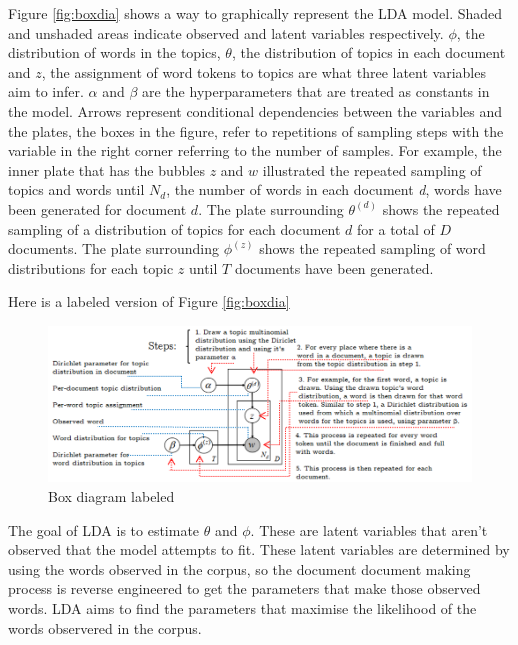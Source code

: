 \documentclass[
]{article}
\begin{document}
Figure \ref{fig:boxdia} shows a way to graphically represent the LDA
model. Shaded and unshaded areas indicate observed and latent variables
respectively. \(\phi\), the distribution of words in the topics,
\(\theta\), the distribution of topics in each document and \(z\), the
assignment of word tokens to topics are what three latent variables aim
to infer. \(\alpha\) and \(\beta\) are the hyperparameters that are
treated as constants in the model. Arrows represent conditional
dependencies between the variables and the plates, the boxes in the
figure, refer to repetitions of sampling steps with the variable in the
right corner referring to the number of samples. For example, the inner
plate that has the bubbles \(z\) and \(w\) illustrated the repeated
sampling of topics and words until \(N_d\), the number of words in each
document \emph{d}, words have been generated for document \(d\). The
plate surrounding \(\theta^{(d)}\) shows the repeated sampling of a
distribution of topics for each document \(d\) for a total of \(D\)
documents. The plate surrounding \(\phi^{(z)}\) shows the repeated
sampling of word distributions for each topic \(z\) until \(T\)
documents have been generated.

Here is a labeled version of Figure \ref{fig:boxdia}

\begin{figure}

{\centering \includegraphics[width=1\linewidth]{images/plate dia lab} 

}

\caption{Box diagram labeled}\label{fig:platedialab}
\end{figure}

The goal of LDA is to estimate \(\theta\) and \(\phi\). These are latent
variables that aren't observed that the model attempts to fit. These
latent variables are determined by using the words observed in the
corpus, so the document document making process is reverse engineered to
get the parameters that make those observed words. LDA aims to find the
parameters that maximise the likelihood of the words observered in the
corpus.
\end{document}
